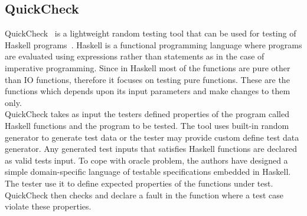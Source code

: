 
\subsection{QuickCheck}
QuickCheck~\cite{Claessen2000} is a lightweight random testing tool that can be used for testing of Haskell programs~\cite{Hudak2007}. Haskell is a functional programming language where programs are evaluated using expressions rather than statements as in the case of imperative programming. Since in Haskell most of the functions are pure other than IO functions, therefore it focuses on testing pure functions. These are the functions which depends upon its input parameters and make changes to them only. \\
QuickCheck takes as input the testers defined properties of the program called Haskell functions and the program to be tested. The tool uses built-in random generator to generate test data or the tester may provide custom define test data generator. Any generated test inputs that satisfies Haskell functions are declared as valid tests input. To cope with oracle problem, the authors have designed a simple domain-specific language of testable specifications embedded in Haskell. The tester use it to define expected properties of the functions under test. QuickCheck then checks and declare a fault in the function where a test case violate these properties.   


